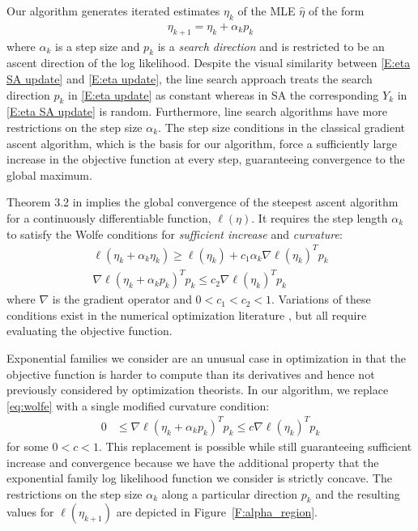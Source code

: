 \documentclass[oneside]{myumnStatThesis}
\begin{document}
Our algorithm generates iterated estimates $\eta_k$ of the MLE $\hat{\eta}$ of the form 
\begin{align} \label{E:eta update}
	\eta_{k+1} = \eta_k + \alpha_k p_k
\end{align}
where $\alpha_k$ is a step size and $p_k$ is a \emph{search direction} and is restricted to be an ascent direction of 
the log likelihood.  
Despite the visual similarity between \eqref{E:eta SA update} and \eqref{E:eta update}, the line search approach treats 
the search direction $p_k$ in \eqref{E:eta update} as constant whereas in SA the corresponding $Y_k$ in \eqref{E:eta SA 
update} is random.
Furthermore, line search algorithms have more restrictions on the step size $\alpha_k$.  
The step size 
conditions in the classical gradient ascent algorithm, which is the basis for our algorithm, force  a sufficiently 
large increase in the objective function at every step, guaranteeing convergence to the global maximum.

Theorem 3.2 in \citep{NW} implies the global convergence of the steepest ascent 
algorithm for a continuously differentiable function, $\ell(\eta)$.  It requires the step length $\alpha_k$ to satisfy 
the Wolfe conditions for \emph{sufficient increase} and \emph{curvature}:
\begin{equation} \label{eq:wolfe}
\begin{split}
	\ell(\eta_k + \alpha_k \eta_k) \geq \ell(\eta_k) + c_1 \alpha_k \nabla \ell (\eta_k)^T p_k \\
	\nabla \ell( \eta_k + \alpha_k p_k)^T p_k \leq c_2 \nabla \ell( \eta_k)^T p_k
\end{split}
\end{equation}
where $\nabla$ is the gradient operator and $0 < c_1 < c_2 < 1$.   
Variations of these conditions exist in the numerical optimization literature \citep{Fletcher,NW,Sun:2006}, but all 
require evaluating the objective function.

Exponential families we consider are an unusual case in optimization in that the objective function 
is harder to compute than its derivatives and hence not previously considered by optimization theorists.
In our algorithm, we replace \eqref{eq:wolfe} with a single modified curvature condition:
\begin{align} \label{E:curvature mod}
	 0 & \leq \nabla \ell( \eta_k + \alpha_k p_k)^T p_k \leq c \nabla \ell(\eta_k)^T p_k
\end{align}
for some $0 < c < 1$.  This replacement is possible while still guaranteeing sufficient increase and convergence 
because we have the additional property that the exponential family log likelihood function we consider is strictly 
concave.  The restrictions on the step size $\alpha_k$ along a particular direction $p_k$ and the resulting values for 
$\ell(\eta_{k+1})$ are depicted in Figure~\ref{F:alpha_region}.  
\end{document}
